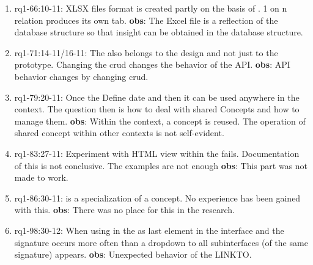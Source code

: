 \begin{enumerate}
    \item rq1-66:10-11: XLSX files format is created partly on the basis of .
    1 on n relation produces its own tab.
    \newline\textbf{obs}: The Excel file is a reflection of the database structure so that insight can be obtained in the database structure.
     
    
    \item rq1-71:14-11/16-11: The  also belongs to the design and not just to the prototype.
    Changing the \acrlong{crud} changes the behavior of the API.
    \newline\textbf{obs}: API behavior changes by changing \acrshort{crud}.
     
    \item rq1-79:20-11: Once the  Define date and then it can be used anywhere in the context.
    The question then is how to deal with shared Concepts and how to manage them.
    \newline\textbf{obs}: Within the context, a concept is reused.
    The operation of shared concept within other contexts is not self-evident.
     
    \item rq1-83:27-11: Experiment with HTML view within the  fails.
    Documentation of this is not conclusive.
    The examples are not enough
    \newline\textbf{obs}: This part was not made to work.    
    
    \item rq1-86:30-11:  is a specialization of a concept.
    No experience has been gained with this.
    \newline\textbf{obs}: There was no place for this in the research.
     
    \item rq1-98:30-12: When using  in the  as last element in the interface and the signature occurs more often than a dropdown to all subinterfaces (of the same signature) appears.
    \newline\textbf{obs}: Unexpected behavior of the LINKTO.
    
\end{enumerate}

